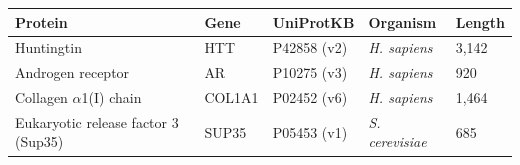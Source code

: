 \begin{tabular}{@{}lllll@{}}
\toprule
Protein & Gene & UniProtKB & Organism & Length \\
\midrule
Huntingtin & HTT & P42858 (v2) & \textit{H. sapiens} & 3{,}142 \\
Androgen receptor & AR & P10275 (v3) & \textit{H. sapiens} & 920 \\
Collagen $\alpha$1(I) chain & COL1A1 & P02452 (v6) & \textit{H. sapiens} & 1{,}464 \\
Eukaryotic release factor 3 (Sup35) & SUP35 & P05453 (v1) & \textit{S. cerevisiae} & 685 \\
\bottomrule
\end{tabular}
